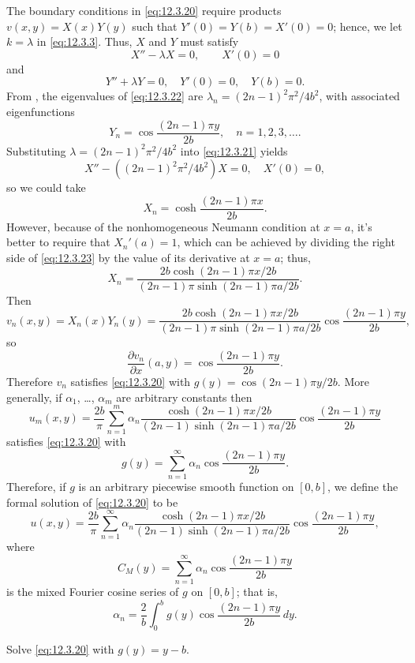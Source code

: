 \begin{solution}
The boundary conditions in \eqref{eq:12.3.20} require
 products $v(x,y)=X(x)Y(y)$ such that
$Y'(0)=Y(b)=X'(0)=0$; hence, we let $k=\lambda$ in
\eqref{eq:12.3.3}. Thus, $X$ and $Y$ must satisfy
\begin{equation} \label{eq:12.3.21}
X''-\lambda X=0,\quad \quad X'(0)=0
\end{equation}
and
\begin{equation} \label{eq:12.3.22}
Y''+\lambda Y=0,\quad Y'(0)=0,\quad Y(b)=0.
\end{equation}
 From , the eigenvalues of \eqref{eq:12.3.22}
are $\lambda_n=(2n-1)^2\pi^2/4b^2$, with
associated eigenfunctions
\[
Y_n=\cos\frac{(2n-1)\pi y}{2b}, \quad n=1,2,3,\dots.
\]
Substituting $\lambda=(2n-1)^2\pi^2/4b^2$  into
\eqref{eq:12.3.21} yields
\[
X''-((2n-1)^2\pi^2/4b^2)X=0,\quad X'(0)=0,
\]
so we could take
\begin{equation} \label{eq:12.3.23}
X_n=\cosh\frac{(2n-1)\pi x}{2b}.
\end{equation}
However, because of the nonhomogeneous Neumann condition at $x=a$, it's
better to require that
$X_n'(a)=1$, which can be achieved by  dividing the right side
of
\eqref{eq:12.3.23} by the   value of its derivative  at $x=a$; thus,
\[
X_n=
\frac{2b\cosh(2n-1)\pi x/2b}{(2n-1)\pi\sinh(2n-1)\pi a/2b}.
\]
Then
\[
v_n(x,y)=X_n(x)Y_n(y)=
\frac{2b\cosh(2n-1)\pi x/2b}{(2n-1)\pi\sinh(2n-1)\pi a/2b}\cos\frac{(2n-1)\pi
y}{2b},
\]
so
\[
\frac{\partial v_n}{\partial x}(a,y)=\cos\frac{(2n-1)\pi y}{2b}.
\]
Therefore
 $v_n$ satisfies \eqref{eq:12.3.20} with $g(y)=\cos(2n-1)\pi y/2b$. More
generally,
 if $\alpha_1$, \dots, $\alpha_m$ are arbitrary constants
then
\[
u_m(x,y)=\frac{2b}{\pi}\sum_{n=1}^m \alpha_n
\frac{\cosh(2n-1)\pi x/2b}{(2n-1)\sinh(2n-1)\pi a/2b}\cos\frac{(2n-1)\pi y}{2b}
\]
satisfies \eqref{eq:12.3.20} with
\[
g(y)=\sum_{n=1}^\infty \alpha_n\cos\frac{(2n-1)\pi y}{2b}.
\]
Therefore, if $g$ is an arbitrary piecewise smooth function on
$[0,b]$,  we define the formal solution of \eqref{eq:12.3.20} to be
\[
u(x,y)=\frac{2b}{\pi}\sum_{n=1}^\infty \alpha_n
\frac{\cosh(2n-1)\pi x/2b}{(2n-1)\sinh(2n-1)\pi a/2b}\cos\frac{(2n-1)\pi y}{2b},
\]
where
\[
C_M(y)=\sum_{n=1}^\infty \alpha_n\cos\frac{(2n-1)\pi y}{2b}
\]
 is the mixed Fourier cosine series of $g$ on $[0,b]$;
that is,
\[
\alpha_n=\frac{2}{b}\int_0^bg(y)\cos\frac{(2n-1)\pi y}{2b}\,dy.
\]
\end{solution}

\begin{example}\label{example:12.3.8}
Solve \eqref{eq:12.3.20} with $g(y)=y-b$.
\end{example}

